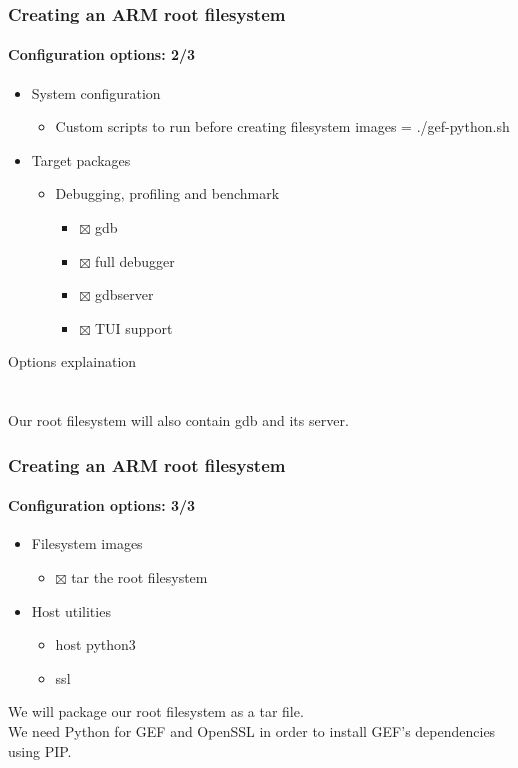 {  \begin{frame}
    \frametitle{Creating an ARM root filesystem}
    \framesubtitle{Configuration options: 2/3}
    \begin{itemize}
      \toolchainOptionsList
      \item System configuration
      \begin{itemize}
        \item Custom scripts to run before creating filesystem images = ./gef-python.sh
      \end{itemize}
      \item Target packages
      \begin{itemize}
        \item Debugging, profiling and benchmark
        \begin{itemize}
          \item $\boxtimes$ gdb
          \item $\boxtimes$ full debugger
          \item $\boxtimes$ gdbserver
          \item $\boxtimes$ TUI support
        \end{itemize}
      \end{itemize}
    \end{itemize}
  \end{frame}
   {
    Options explaination \\
    \toolchainOptionsDescription \\
    \gefPythonDescription \\
    Our root filesystem will also contain gdb and its server.
  }

  \begin{frame}
    \frametitle{Creating an ARM root filesystem}
    \framesubtitle{Configuration options: 3/3}
    \begin{itemize}
      \item Filesystem images
      \begin{itemize}
        \item $\boxtimes$ tar the root filesystem
      \end{itemize}
      \item Host utilities
      \begin{itemize}
        \item host python3
        \item ssl
      \end{itemize}
    \end{itemize}
  \end{frame}
   {
    We will package our root filesystem as a tar file. \\
    We need Python for GEF and OpenSSL in order to install GEF's dependencies using PIP.
  }

}
